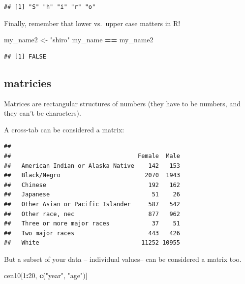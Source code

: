\documentclass[]{book}
\newenvironment{Shaded}{\begin{snugshade}}{\end{snugshade}}
\newcommand{\KeywordTok}[1]{\textcolor[rgb]{0.13,0.29,0.53}{\textbf{#1}}}
\newcommand{\DecValTok}[1]{\textcolor[rgb]{0.00,0.00,0.81}{#1}}
\newcommand{\StringTok}[1]{\textcolor[rgb]{0.31,0.60,0.02}{#1}}
\newcommand{\OperatorTok}[1]{\textcolor[rgb]{0.81,0.36,0.00}{\textbf{#1}}}
\newcommand{\NormalTok}[1]{#1}
\theoremstyle{definition}
\theoremstyle{definition}
\theoremstyle{definition}
\theoremstyle{remark}
\begin{document}
\begin{verbatim}
## [1] "S" "h" "i" "r" "o"
\end{verbatim}

Finally, remember that lower vs.~upper case matters in R!

\begin{Shaded}
\begin{Highlighting}[]
\NormalTok{my_name2 <-}\StringTok{ "shiro"}
\NormalTok{my_name }\OperatorTok{==}\StringTok{ }\NormalTok{my_name2}
\end{Highlighting}
\end{Shaded}

\begin{verbatim}
## [1] FALSE
\end{verbatim}

\subsection{matricies}\label{matricies}

Matrices are rectangular structures of numbers (they have to be numbers,
and they can't be characters).

A cross-tab can be considered a matrix:

\begin{Shaded}
\end{Shaded}

\begin{verbatim}
##                                   
##                                    Female  Male
##   American Indian or Alaska Native    142   153
##   Black/Negro                        2070  1943
##   Chinese                             192   162
##   Japanese                             51    26
##   Other Asian or Pacific Islander     587   542
##   Other race, nec                     877   962
##   Three or more major races            37    51
##   Two major races                     443   426
##   White                             11252 10955
\end{verbatim}

But a subset of your data -- individual values-- can be considered a
matrix too.

\begin{Shaded}
\begin{Highlighting}[]
\NormalTok{cen10[}\DecValTok{1}\OperatorTok{:}\DecValTok{20}\NormalTok{, }\KeywordTok{c}\NormalTok{(}\StringTok{"year"}\NormalTok{, }\StringTok{"age"}\NormalTok{)]}
\end{Highlighting}
\end{Shaded}
\end{document}
